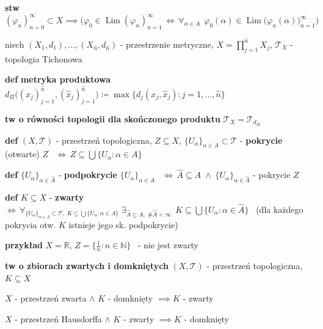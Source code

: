 \documentclass[a4paper,12pt]{article}
\begin{document}
\bigskip
\textbf{stw} \; \((\varphi_n)_{n=0}^{\infty} \subset X \implies \Big(\varphi_0 \in \operatorname{Lim}(\varphi_n)_{n=1}^{\infty} \, \iff \, \forall_{\alpha \in A} \;\, \varphi_0(\alpha) \in \operatorname{Lim}\big(\varphi_n(\alpha)\big)_{n=1}^{\infty}\Big)\)

\bigskip
niech \((X_1, d_1), \dots, (X_{\hat{n}}, d_{\hat{n}})\) - przestrzenie metryczne, \; \(X = \prod_{j=1}^{\hat{n}} X_j\), \; \(\mathcal{T}_X\) - topologia Tichonowa

\bigskip
\textbf{def} \; \textbf{metryka produktowa} \, \(d_\Pi\big((x_j)_{j=1}^{\hat{n}}, (\hat{x}_j)_{j=1}^{\hat{n}}\big) \coloneqq \max\{d_j(x_j, \hat{x}_j) : j = 1, \dots, \hat{n}\}\)

\smallskip
\textbf{tw o równości topologii dla skończonego produktu} \; \(\mathcal{T}_X = \mathcal{T}_{d_\Pi}\)

\bigskip
\textbf{def} \; \((X, \mathcal{T})\) - przestrzeń topologiczna, \; \(Z \subseteq X\), \; \(\{U_\alpha\}_{\alpha \in A} \subset \mathcal{T}\) - \textbf{pokrycie} (otwarte) \(Z\) \, \(\iff \, Z \subseteq \bigcup \{U_\alpha : \alpha \in A\}\)

\smallskip
\textbf{def} \; \(\{U_\alpha\}_{\alpha \in \hat{A}}\) - \textbf{podpokrycie} \(\{U_\alpha\}_{\alpha \in A}\) \, \(\iff \, \hat{A} \subseteq A \; \land \; \{U_\alpha\}_{\alpha \in \hat{A}}\) - pokrycie \(Z\)

\bigskip
\textbf{def} \; \(K \subseteq X\) - \textbf{zwarty} \, \(\iff \, \forall_{\{U_\alpha\}_{\alpha \in A} \subset \mathcal{T}, \; K \subseteq \bigcup \{U_\alpha : \alpha \in A\}} \; \exists_{\hat{A} \subseteq A, \; \#\hat{A} < \infty} \;\, K \subseteq \bigcup \{U_\alpha : \alpha \in \hat{A}\}\) \, 
(dla każdego pokrycia otw. $K$ istnieje jego sk. podpokrycie)

\bigskip
\begin{logbox}
\textbf{przykład} \; \(X = \mathbb{R}\), \; \(Z = \{\frac{1}{n} : n \in \mathbb{N}\}\) \, - nie jest zwarty
\end{logbox}

\bigskip
\textbf{tw o zbiorach zwartych i domkniętych} \; \((X, \mathcal{T})\) - przestrzeń topologiczna, \; \(K \subseteq X\)
\begin{podpunkty}
    \item \(X\) - przestrzeń zwarta \; \(\land\) \; \(K\) - domknięty \(\implies K\) - zwarty
    \item \(X\) - przestrzeń Hausdorffa \; \(\land\) \; \(K\) - zwarty \(\implies K\) - domknięty
\end{podpunkty}
\end{document}
